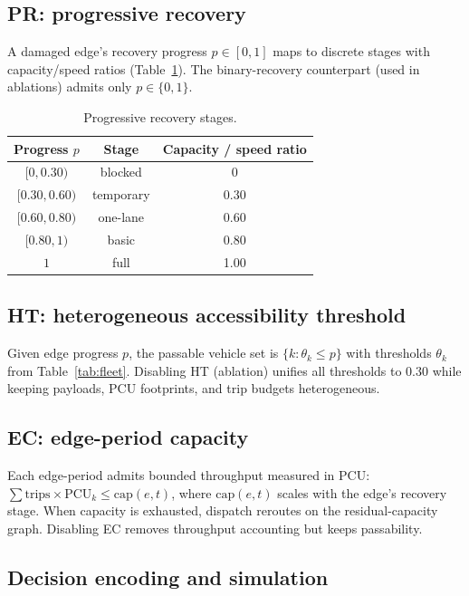 \documentclass[10pt,conference,letterpaper]{IEEEtran}
\begin{document}
\subsection{PR: progressive recovery}

A damaged edge's recovery progress $p\in[0,1]$ maps to discrete stages
with capacity/speed ratios (Table~\ref{tab:stages}). The binary-recovery
counterpart (used in ablations) admits only $p\in\{0,1\}$.

\begin{table}[t]
\centering
\caption{Progressive recovery stages.}
\label{tab:stages}
\begin{tabular}{ccc}
\toprule
Progress $p$ & Stage & Capacity / speed ratio \\
\midrule
$[0,0.30)$ & blocked   & 0 \\
$[0.30,0.60)$ & temporary & 0.30 \\
$[0.60,0.80)$ & one-lane  & 0.60 \\
$[0.80,1)$ & basic     & 0.80 \\
$1$ & full & 1.00 \\
\bottomrule
\end{tabular}
\end{table}

\subsection{HT: heterogeneous accessibility threshold}

Given edge progress $p$, the passable vehicle set is
$\{k : \theta_k \le p\}$ with thresholds $\theta_k$ from
Table~\ref{tab:fleet}. Disabling HT (ablation) unifies all thresholds to
$0.30$ while keeping payloads, PCU footprints, and trip budgets
heterogeneous.

\subsection{EC: edge-period capacity}

Each edge-period admits bounded throughput measured in PCU:
$\sum \text{trips}\times\mathrm{PCU}_k \le \mathrm{cap}(e,t)$, where
$\mathrm{cap}(e,t)$ scales with the edge's recovery stage. When capacity
is exhausted, dispatch reroutes on the residual-capacity graph. Disabling
EC removes throughput accounting but keeps passability.

\subsection{Decision encoding and simulation}
\end{document}
